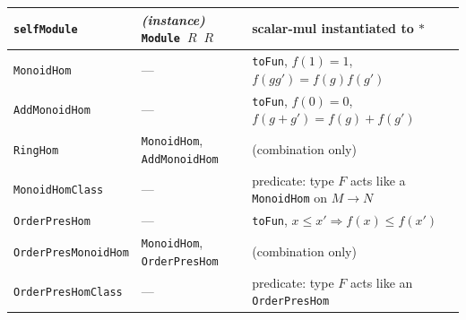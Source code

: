 \documentclass[11pt]{article}
\begin{document}
\begin{longtable}{@{}p{3.1cm}p{4.6cm}p{6.3cm}@{}}
\texttt{selfModule} & \emph{(instance)} \texttt{Module}~$R$~$R$ & scalar-mul instantiated to $*$ \\
\midrule
\texttt{MonoidHom} & --- & \texttt{toFun}, $f(1){=}1$, $f(gg'){=}f(g)f(g')$ \\
\texttt{AddMonoidHom} & --- & \texttt{toFun}, $f(0){=}0$, $f(g{+}g'){=}f(g){+}f(g')$ \\
\texttt{RingHom} & \texttt{MonoidHom}, \texttt{AddMonoidHom} & (combination only) \\
\texttt{MonoidHomClass} & --- & predicate: type $F$ acts like a \texttt{MonoidHom} on $M\to N$ \\
\texttt{OrderPresHom} & --- & \texttt{toFun}, $x\le x'\Rightarrow f(x)\le f(x')$ \\
\texttt{OrderPresMonoidHom} & \texttt{MonoidHom}, \texttt{OrderPresHom} & (combination only) \\
\texttt{OrderPresHomClass} & --- & predicate: type $F$ acts like an \texttt{OrderPresHom} \\
\bottomrule
\end{longtable}
\end{document}
